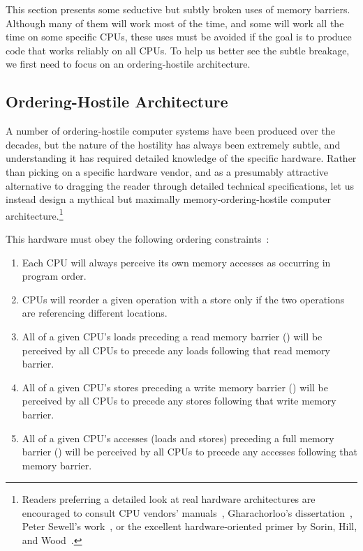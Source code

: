 This section presents some seductive but subtly broken uses of
memory barriers.
Although many of them will work most of the time, and some will
work all the time on some specific CPUs, these uses must be avoided
if the goal is to produce code that works reliably on all CPUs.
To help us better see the subtle breakage, we first need to focus
on an ordering-hostile architecture.

\subsection{Ordering-Hostile Architecture}
\label{sec:app:whymb:Ordering-Hostile Architecture}

A number of ordering-hostile computer systems have been produced over
the decades,
but the nature of the hostility has always been extremely subtle,
and understanding it has required detailed knowledge of the specific
hardware.
Rather than picking on a specific hardware vendor, and as a presumably
attractive alternative to dragging the reader through detailed
technical specifications, let us instead design a mythical but maximally
memory-ordering-hostile computer architecture.\footnote{
	Readers preferring a detailed look at real hardware
	architectures are encouraged to consult CPU vendors'
	manuals~\cite{ALPHA95,AMDOpteron02,IntelItanium02v2,PowerPC94,MichaelLyons05a,SPARC94,IntelXeonV3-96a,IntelXeonV2b-96a,IBMzSeries04a},
	Gharachorloo's dissertation~\cite{Gharachorloo95},
	Peter Sewell's work~\cite{PeterSewell2021weakmemory}, or
	the excellent hardware-oriented primer by
	Sorin, Hill, and Wood~\cite{DanielJSorin2011MemModel}.}

This hardware must obey the following ordering
constraints~\cite{PaulMcKenney2005i,PaulMcKenney2005j}:
\begin{enumerate}
\item	Each CPU will always perceive its own memory accesses
	as occurring in program order.
\item	CPUs will reorder a given operation with a store only
	if the two operations are referencing different locations.
\item	All of a given CPU's loads preceding a read memory barrier
	() will be perceived by all CPUs to precede
	any loads following that read memory barrier.
\item	All of a given CPU's stores preceding a write memory barrier
	() will be perceived by all CPUs to precede
	any stores following that write memory barrier.
\item	All of a given CPU's accesses (loads and stores) preceding a
	full memory barrier
	() will be perceived by all CPUs to precede
	any accesses following that memory barrier.
\end{enumerate}

